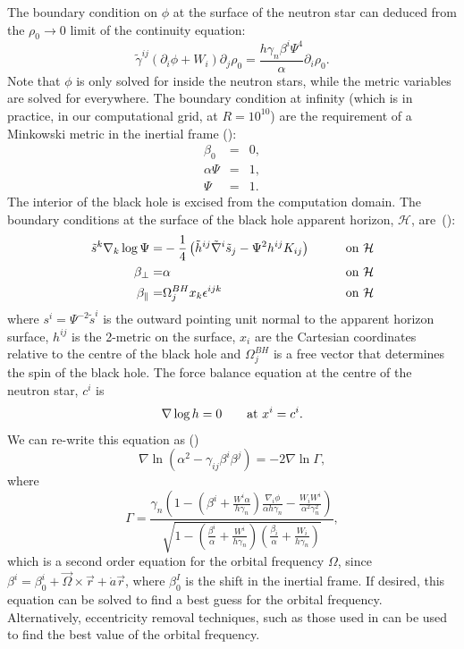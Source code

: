 The boundary condition on $\phi$ at the surface of the neutron star can deduced from the $\rho_0\rightarrow 0$ limit of the continuity equation:
\begin{equation}
\tilde{\gamma}^{ij}\left(\partial_i\phi+W_i\right)\partial_j\rho_0=\frac{h\gamma_n\beta^i\Psi^4}{\alpha}\partial_i\rho_0.
\end{equation}
Note that $\phi$ is only solved for inside the neutron stars, while
the metric variables are solved for everywhere.
The boundary condition at infinity (which is in practice, in our
computational grid, at $R=10^{10}$) are the requirement of a Minkowski
metric in the inertial frame (\cite{FoucartEtAl:2008}):
\begin{eqnarray}
\beta_0&=&0,\\
\alpha\Psi &=& 1,\\
\Psi &=&1.
\end{eqnarray}
The interior of the black hole is excised from the computation
domain. The boundary conditions at the surface of the black hole
apparent horizon, $\mathcal{H}$, are~(\cite{Cook2004}):
\begin{align}
\tilde{s}^k\nabla_k\log\Psi=&-\frac{1}{4}\left(\tilde{h}^{ij}\tilde{\nabla}^i\tilde{s}_j-\Psi^2h^{ij}K_{ij}\right)
\qquad &{\rm on} ~\mathcal{H} \label{eq:BhBoundary}\\
\beta_{\perp}=&\alpha &{\rm on} ~\mathcal{H} \label{eq:BhBoundary2} \\
\beta_{\parallel}=&\Omega_{j}^{BH}x_k\epsilon^{ijk}
&{\rm on}
~\mathcal{H} \label{eq:BhBoundary3}
\end{align}
where $s^i=\Psi^{-2}\tilde{s}^i$ is the outward pointing unit normal to the apparent horizon
surface, $h^{ij}$ is the 2-metric on the surface, $x_i$ are the
Cartesian coordinates relative to the centre of the black hole and $\Omega_j^{BH}$ is a
free vector that determines the spin of the black hole.
The force balance equation at the centre of the neutron star, $c^i$ is 
\begin{equation}
\nabla\log h=0 \qquad {\rm at}~x^i=c^i.
\end{equation}
We can re-write this equation as (\cite{Tichy:2011gw}) 
 \begin{equation}
\label{eq:OmegaDriver}
\nabla\ln\left(\alpha^2-\gamma_{ij}\beta^{i}\beta^{j}\right)=-2\nabla\ln\Gamma,
\end{equation}
where
\begin{equation}
\Gamma
=\frac{\gamma_n\left(1-\left(\beta^i+\frac{W^i\alpha}{h\gamma_n}\right)\frac{\nabla_i\phi}{\alpha
    h\gamma_n}- \frac{W_i W^i}{\alpha^2\gamma_n^2}\right) } { \sqrt{ 1
    - \left(\frac{\beta^i}{\alpha}+\frac{W^i}{h\gamma_n}\right)
    \left(\frac{\beta_i}{\alpha}+\frac{W_i}{h\gamma_n}\right) } } ,
\end{equation}
which is a second order equation for the orbital
frequency $\Omega$, since $\beta^i=\beta^i_0 +
\vec{\Omega}\times\vec{r} + \dot{a}\vec{r}$, where $\beta^I_0$ is the
shift in the inertial frame. If desired, this equation can be solved to find a
best guess for the orbital frequency. Alternatively, eccentricity
removal techniques, such as those used in \cite{Tacik:2015tja} can be
used to find the best value of the orbital frequency.

